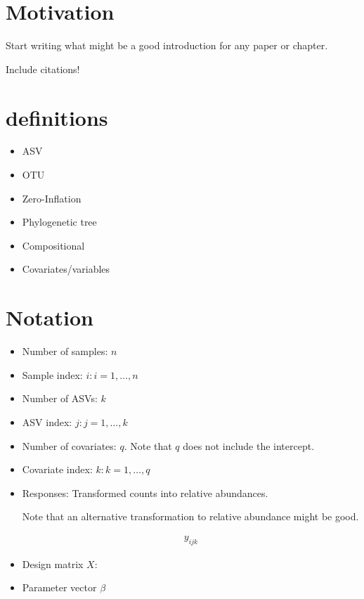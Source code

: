 \documentclass[10pt]{article}
\theoremstyle{definition}
\begin{document}
\tableofcontents

\newpage

\section{Motivation}

Start writing what might be a good introduction for any paper or chapter.

Include citations!

\section{definitions}

\begin{itemize}
  \item ASV
  \item OTU
  \item Zero-Inflation
  \item Phylogenetic tree
  \item Compositional
  \item Covariates/variables
\end{itemize}

\section{Notation}

\begin{itemize}
  \item Number of samples: $n$
  \item Sample index: $i: i = 1, \ldots, n$
  \item Number of ASVs: $k$
  \item ASV index: $j: j = 1, \ldots , k$
  \item Number of covariates: $q$. Note that $q$ does not include the intercept.
  \item Covariate index: $k: k = 1, \ldots , q$

  \item Responses: Transformed counts into relative abundances.

  Note that an alternative transformation to relative abundance might be good. %

   \begin{align*}
     y_{ijk}
   \end{align*}

   \item Design matrix $X$:

   \item Parameter vector $\beta$



\end{itemize}
\end{document}
